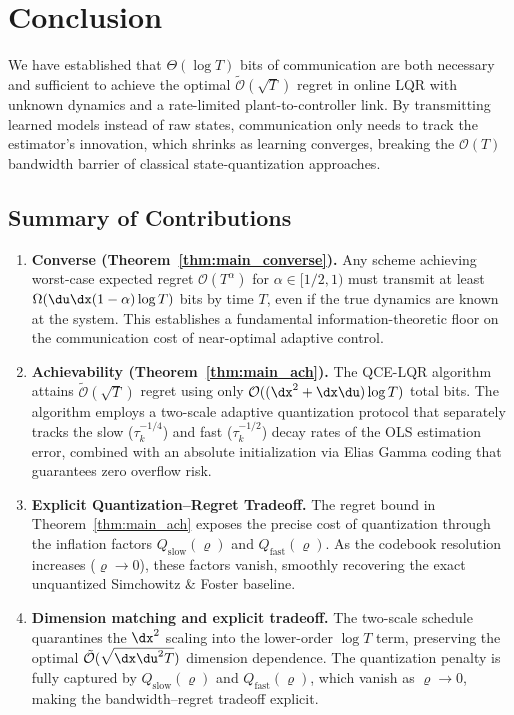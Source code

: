 \documentclass[11pt,journal,onecolumn]{IEEEtran}
\begin{document}
\section{Conclusion}

We have established that $\Theta(\log T)$ bits of communication are both necessary and sufficient to achieve the optimal $\tilde{\mathcal{O}}(\sqrt{T})$ regret in online LQR with unknown dynamics and a rate-limited plant-to-controller link. By transmitting learned models instead of raw states, communication only needs to track the estimator's innovation, which shrinks as learning converges, breaking the $\mathcal{O}(T)$ bandwidth barrier of classical state-quantization approaches.

\subsection*{Summary of Contributions}

\begin{enumerate}
    \item \textbf{Converse (Theorem~\ref{thm:main_converse}).} Any scheme achieving worst-case expected regret $\mathcal{O}(T^\alpha)$ for $\alpha \in [1/2,1)$ must transmit at least $\Omega(\du\dx(1-\alpha)\log T)$ bits by time $T$, even if the true dynamics are known at the system. This establishes a fundamental information-theoretic floor on the communication cost of near-optimal adaptive control.

    \item \textbf{Achievability (Theorem~\ref{thm:main_ach}).} The QCE-LQR algorithm attains $\tilde{\mathcal{O}}(\sqrt{T})$ regret using only $\mathcal{O}((\dx^2 + \dx\du)\log T)$ total bits. The algorithm employs a two-scale adaptive quantization protocol that separately tracks the slow ($\tau_k^{-1/4}$) and fast ($\tau_k^{-1/2}$) decay rates of the OLS estimation error, combined with an absolute initialization via Elias Gamma coding that guarantees zero overflow risk.

    \item \textbf{Explicit Quantization--Regret Tradeoff.} The regret bound in Theorem~\ref{thm:main_ach} exposes the precise cost of quantization through the inflation factors $Q_{\mathrm{slow}}(\varrho)$ and $Q_{\mathrm{fast}}(\varrho)$. As the codebook resolution increases ($\varrho \to 0$), these factors vanish, smoothly recovering the exact unquantized Simchowitz \& Foster baseline.
    \item \textbf{Dimension matching and explicit tradeoff.} The two-scale schedule quarantines the $\dx^2$ scaling into the lower-order $\log T$ term, preserving the optimal $\tilde{\mathcal{O}}(\sqrt{\dx\du^2 T})$ dimension dependence. The quantization penalty is fully captured by $Q_{\mathrm{slow}}(\varrho)$ and $Q_{\mathrm{fast}}(\varrho)$, which vanish as $\varrho \to 0$, making the bandwidth--regret tradeoff explicit.
\end{enumerate}
\end{document}
